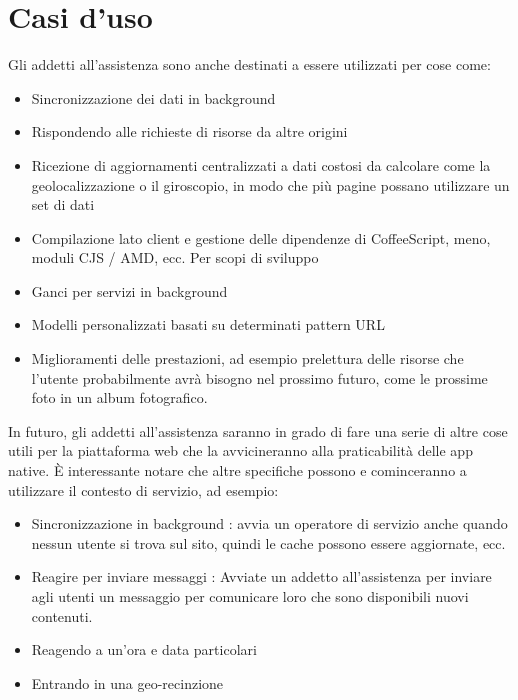 \documentclass[italian]{article}
\begin{document}
\section{Casi d'uso}
Gli addetti all'assistenza sono anche destinati a essere utilizzati per cose come:
\begin{itemize}
\item Sincronizzazione dei dati in background
\item Rispondendo alle richieste di risorse da altre origini
\item Ricezione di aggiornamenti centralizzati a dati costosi da calcolare come la geolocalizzazione o il giroscopio, in modo che più pagine possano utilizzare un set di dati
\item Compilazione lato client e gestione delle dipendenze di CoffeeScript, meno, moduli CJS / AMD, ecc. Per scopi di sviluppo
\item Ganci per servizi in background
\item Modelli personalizzati basati su determinati pattern URL
\item Miglioramenti delle prestazioni, ad esempio prelettura delle risorse che l'utente probabilmente avrà bisogno nel prossimo futuro, come le prossime foto in un album fotografico.
\end{itemize}
In futuro, gli addetti all'assistenza saranno in grado di fare una serie di altre cose utili per la piattaforma web che la avvicineranno alla praticabilità delle app native. È interessante notare che altre specifiche possono e cominceranno a utilizzare il contesto di servizio, ad esempio:
\begin{itemize}
\item Sincronizzazione in background : avvia un operatore di servizio anche quando nessun utente si trova sul sito, quindi le cache possono essere aggiornate, ecc.
\item Reagire per inviare messaggi : Avviate un addetto all'assistenza per inviare agli utenti un messaggio per comunicare loro che sono disponibili nuovi contenuti.
\item Reagendo a un'ora e data particolari
\item Entrando in una geo-recinzione
\end{itemize}
\end{document}
